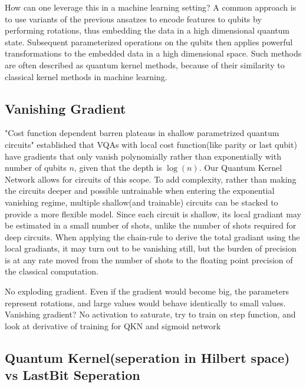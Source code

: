 \documentclass[]{article}
\begin{document}
How can one leverage this in a machine learning setting? A common approach is to use variants of the previous ansatzes to encode features to qubits by performing rotations, thus embedding the data in a high dimensional quantum state. Subsequent parameterized operations on the qubits then applies powerful transformations to the embedded data in a high dimensional space. Such methods are often described as quantum kernel methods, because of their similarity to classical kernel methods in machine learning.

\subsection{Vanishing Gradient}
"Cost function dependent barren plateaus in shallow parametrized quantum circuits" established that VQAs with local cost function(like parity or last qubit) have gradients that only vanish polynomially rather than exponentially with number of qubits $n$, given that the depth is $\log(n)$. Our Quantum Kernel Network allows for circuits of this scope. To add complexity, rather than making the circuits deeper and possible untrainable when entering the exponential vanishing regime, multiple shallow(and trainable) circuits can be stacked to provide a more flexible model. Since each circuit is shallow, its local gradiant may be estimated in a small number of shots, unlike the number of shots required for deep circuits. When applying the chain-rule to derive the total gradiant using the local gradiants, it may turn out to be vanishing still, but the burden of precision is at any rate moved from the number of shots to the floating point precision of the classical computation.  

No exploding gradient. Even if the gradient would become big, the parameters represent rotations, and large values would behave identically to small values. Vanishing gradient? No activation to saturate, try to train on step function, and look at derivative of training for QKN and sigmoid network

\subsection{Quantum Kernel(seperation in Hilbert space) vs LastBit Seperation}

\newpage
\printbibliography[heading=bibintoc, title={References}]
\end{document}
